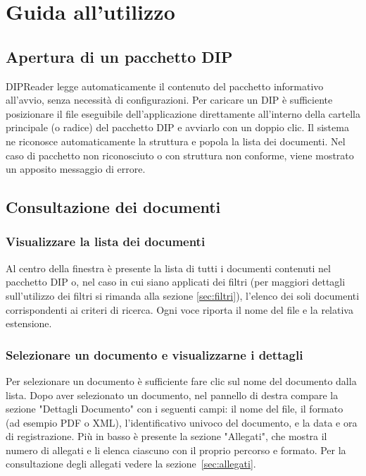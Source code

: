\documentclass[a4paper,12pt]{article}
\begin{document}
    \section{Guida all'utilizzo}
        \subsection{Apertura di un pacchetto DIP}
        \label{sec:apertura}
        DIPReader legge automaticamente il contenuto del pacchetto informativo all'avvio, senza necessità di configurazioni. Per caricare un DIP è sufficiente posizionare il file eseguibile dell'applicazione direttamente all'interno della cartella principale (o radice) del pacchetto DIP e avviarlo con un doppio clic.
        Il sistema ne riconosce automaticamente la struttura e popola la lista dei documenti. Nel caso di pacchetto non riconosciuto o con struttura non conforme, viene mostrato un apposito messaggio di errore.

        \subsection{Consultazione dei documenti}
            \subsubsection{Visualizzare la lista dei documenti}
            Al centro della finestra è presente la lista di tutti i documenti contenuti nel pacchetto DIP o, nel caso in cui siano applicati dei filtri (per maggiori dettagli sull'utilizzo dei filtri si rimanda alla sezione \ref{sec:filtri}), l'elenco dei soli documenti corrispondenti ai criteri di ricerca. Ogni voce riporta il nome del file e la relativa estensione.          
            
            \subsubsection{Selezionare un documento e visualizzarne i dettagli}
            Per selezionare un documento è sufficiente fare clic sul nome del documento dalla lista. 
            Dopo aver selezionato un documento, nel pannello di destra compare la sezione "Dettagli Documento" con i seguenti campi: il nome del file, il formato (ad esempio PDF o XML), l'identificativo univoco del documento, e la data e ora di registrazione. Più in basso è presente la sezione "Allegati", che mostra il numero di allegati e li elenca ciascuno con il proprio percorso e formato.
            Per la consultazione degli allegati vedere la sezione~\ref{sec:allegati}.
\end{document}
